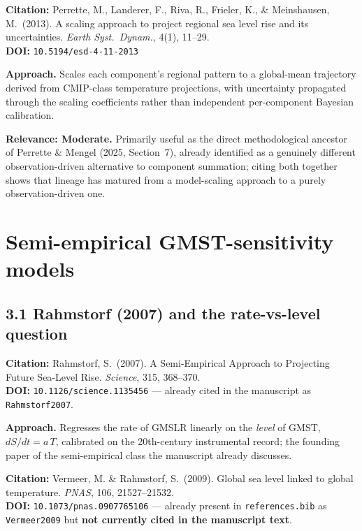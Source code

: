 \documentclass[11pt]{article}
\begin{document}
\noindent\textbf{Citation:} Perrette, M., Landerer, F., Riva, R.,
Frieler, K., \& Meinshausen, M.\ (2013). A scaling approach to project
regional sea level rise and its uncertainties. \textit{Earth Syst.\
Dynam.}, 4(1), 11--29.\\
\textbf{DOI:} \texttt{10.5194/esd-4-11-2013}

\noindent\textbf{Approach.} Scales each component's regional pattern to a
global-mean trajectory derived from CMIP-class temperature projections,
with uncertainty propagated through the scaling coefficients rather than
independent per-component Bayesian calibration.

\noindent\textbf{Relevance: Moderate.} Primarily useful as the direct
methodological ancestor of Perrette \& Mengel (2025, Section~7), already
identified as a genuinely different observation-driven alternative to
component summation; citing both together shows that lineage has matured
from a model-scaling approach to a purely observation-driven one.

\section{Semi-empirical GMST-sensitivity models}

\subsection*{3.1 Rahmstorf (2007) and the rate-vs-level question}

\noindent\textbf{Citation:} Rahmstorf, S.\ (2007). A Semi-Empirical
Approach to Projecting Future Sea-Level Rise. \textit{Science}, 315,
368--370.\\
\textbf{DOI:} \texttt{10.1126/science.1135456} --- already cited in the
manuscript as \texttt{Rahmstorf2007}.

\noindent\textbf{Approach.} Regresses the rate of GMSLR linearly on the
\emph{level} of GMST, $dS/dt = a\,T$, calibrated on the 20th-century
instrumental record; the founding paper of the semi-empirical class the
manuscript already discusses.

\noindent\textbf{Citation:} Vermeer, M. \& Rahmstorf, S.\ (2009). Global
sea level linked to global temperature. \textit{PNAS}, 106, 21527--21532.\\
\textbf{DOI:} \texttt{10.1073/pnas.0907765106} --- already present in
\texttt{references.bib} as \texttt{Vermeer2009} but \textbf{not currently
cited in the manuscript text}.
\end{document}
